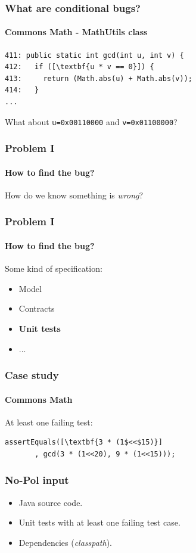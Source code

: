 \documentclass{beamer}
\begin{document}
\begin{frame}[fragile]
\frametitle{What are conditional bugs?}
\framesubtitle{Commons Math - MathUtils class}
    
\begin{lstlisting}[escapeinside=\[\]]
411: public static int gcd(int u, int v) {
412:   if ([\textbf{u * v == 0}]) {
413:     return (Math.abs(u) + Math.abs(v));
414:   }
...
\end{lstlisting}

\vspace{2em}

\centering What about \texttt{u=0x00110000} and  \texttt{v=0x01100000}?

\end{frame}

\begin{frame}
\frametitle{Problem I}
\framesubtitle{How to find the bug?}
How do we know something is \textit{wrong}?
\end{frame}

\begin{frame}
\frametitle{Problem I}
\framesubtitle{How to find the bug?}
Some kind of specification:
\begin{itemize}
 \item Model
 \item Contracts
 \item \textbf{Unit tests}
 \item ...
\end{itemize}
\end{frame}

\begin{frame}[fragile]
    \frametitle{Case study}
      \framesubtitle{Commons Math}
At least one failing test:
      
      \begin{lstlisting}[escapeinside=\[\]]
assertEquals([\textbf{3 * (1$<<$15)}]
       , gcd(3 * (1<<20), 9 * (1<<15)));
	\end{lstlisting}
\end{frame}

\begin{frame}
\frametitle{No-Pol input}
\begin{itemize}
 \item Java source code.
 \item Unit tests with at least one failing test case.
 \item Dependencies (\textit{classpath}).
\end{itemize}
\end{frame}
\end{document}
